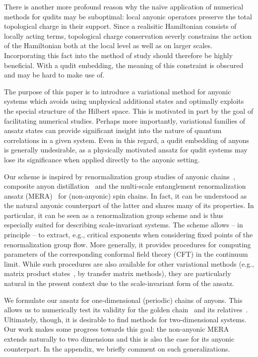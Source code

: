 \documentclass[floats,prb,twocolumn]{revtex4}
\begin{document}
There is  another more profound reason why the na\"ive application of numerical methods for qudits may be suboptimal: local anyonic operators preserve the total topological charge in their support.  Since a realisitic Hamiltonian consists of locally acting terms,  topological charge conservation severly constrains the action of the Hamiltonian both at the local level as well as on larger scales. Incorporating this fact into the method of study should therefore be highly beneficial. With a qudit embedding, the meaning of this constraint is obscured and may be hard to make use of. 

 
The purpose of this paper is to introduce a variational method for anyonic systems which avoids using unphysical additional states and optimally exploits the special structure of the Hilbert space. This is motivated in part by the goal of facilitating numerical studies. Perhaps more importantly, variational families of ansatz states can provide significant insight into the nature of quantum correlations in a given system. Even in this regard, a qudit embedding  of anyons is generally undesirable, as a  physically motivated ansatz for qudit systems may lose its significance when applied directly to  the anyonic setting.

Our scheme is inspired by renormalization group studies of anyonic chains~\cite{BonesteelYang07,Fidkowskietalrandom,Fidkowskietal08b},  composite anyon distillation~\cite{Koe09} and  the  multi-scale entanglement renormalization ansatz (MERA)~\cite{Vidal07,Vidal08} for (non-anyonic) spin chains. In fact, it can be understood as the natural anyonic counterpart of the latter and shares many of its properties. In particular, it can be seen as a renormalization group scheme and is thus especially suited for describing scale-invariant systems.   The scheme allows -- in principle -- to extract, e.g., critical exponents when considering fixed points of the renormalization group flow.  More generally, it provides  procedures for computing parameters of the corresponding conformal field theory  (CFT) in the continuum limit.  While such procedures are also available for other variational methods (e.g., matrix product states~\cite{VerstraeteCirac06,Rom97,Vid04,Verstr04,VerstrMurgCirac08}, by transfer matrix methods), they are particularly natural  in the present context due to the scale-invariant form of the ansatz.
 



We formulate our ansatz for one-dimensional (periodic) chains of anyons. This allows us to numerically test its validity  for the golden chain~\cite{Feiguinetal07} and its relatives~\cite{Trebstetal08}. Ultimately, though, it is desirable to find methods for two-dimensional systems. Our work makes some progress towards this goal: the non-anyonic MERA extends naturally to two dimensions and this is also the case for its anyonic counterpart. In the appendix, we briefly comment on such generalizations. 
\end{document}
